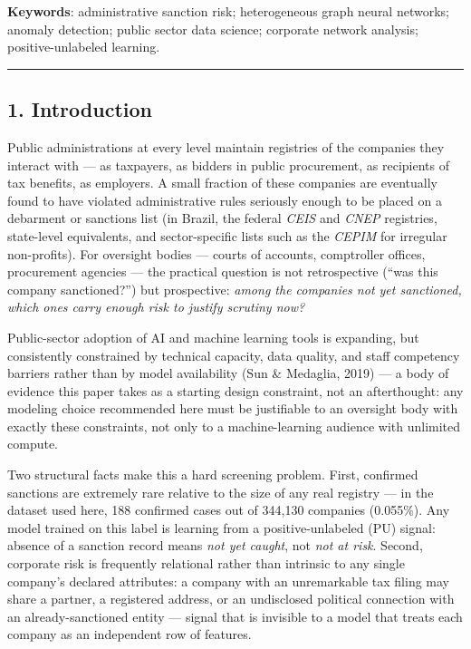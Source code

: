 \documentclass[11pt,]{article}
\begin{document}
\textbf{Keywords}: administrative sanction risk; heterogeneous graph
neural networks; anomaly detection; public sector data science;
corporate network analysis; positive-unlabeled learning.

\begin{center}\rule{0.5\linewidth}{0.5pt}\end{center}

\hypertarget{introduction}{%
\subsection{1. Introduction}\label{introduction}}

Public administrations at every level maintain registries of the
companies they interact with --- as taxpayers, as bidders in public
procurement, as recipients of tax benefits, as employers. A small
fraction of these companies are eventually found to have violated
administrative rules seriously enough to be placed on a debarment or
sanctions list (in Brazil, the federal \emph{CEIS} and \emph{CNEP}
registries, state-level equivalents, and sector-specific lists such as
the \emph{CEPIM} for irregular non-profits). For oversight bodies ---
courts of accounts, comptroller offices, procurement agencies --- the
practical question is not retrospective (``was this company
sanctioned?'') but prospective: \emph{among the companies not yet
sanctioned, which ones carry enough risk to justify scrutiny now?}

Public-sector adoption of AI and machine learning tools is expanding,
but consistently constrained by technical capacity, data quality, and
staff competency barriers rather than by model availability (Sun \&
Medaglia, 2019) --- a body of evidence this paper takes as a starting
design constraint, not an afterthought: any modeling choice recommended
here must be justifiable to an oversight body with exactly these
constraints, not only to a machine-learning audience with unlimited
compute.

Two structural facts make this a hard screening problem. First,
confirmed sanctions are extremely rare relative to the size of any real
registry --- in the dataset used here, 188 confirmed cases out of
344,130 companies (0.055\%). Any model trained on this label is learning
from a positive-unlabeled (PU) signal: absence of a sanction record
means \emph{not yet caught}, not \emph{not at risk}. Second, corporate
risk is frequently relational rather than intrinsic to any single
company's declared attributes: a company with an unremarkable tax filing
may share a partner, a registered address, or an undisclosed political
connection with an already-sanctioned entity --- signal that is
invisible to a model that treats each company as an independent row of
features.
\end{document}
